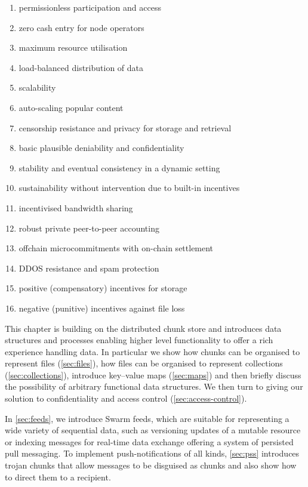 \begin{enumerate}
    \item permissionless participation and access
    \item zero cash entry for node operators
    \item maximum resource utilisation 
    \item load-balanced distribution of data
    \item scalability 
    \item auto-scaling popular content
    \item censorship resistance and privacy for storage and retrieval
    \item basic plausible deniability and confidentiality 
    \item stability and eventual consistency in a dynamic setting
    \item sustainability without intervention due to built-in incentives
    \item incentivised bandwidth sharing
    \item robust private peer-to-peer accounting 
    \item offchain microcommitments with on-chain settlement
    \item DDOS resistance and spam protection
    \item positive (compensatory) incentives for storage
    \item negative (punitive) incentives against file loss
\end{enumerate}

This chapter is building on the distributed chunk store and introduces data structures and processes enabling higher level functionality  to offer a rich experience handling data. In particular we show how chunks can be organised to represent files (\ref{sec:files}), how files can be organised to represent collections (\ref{sec:collections}), introduce key--value maps (\ref{sec:maps}) and then briefly discuss the possibility of arbitrary functional data structures. We then turn to giving our solution to confidentiality and access control (\ref{sec:access-control}). 

In \ref{sec:feeds}, we introduce Swarm feeds, which are suitable for representing a wide variety of sequential data, such as versioning updates of a mutable resource or indexing messages for real-time data exchange offering a system of persisted pull messaging. To implement push-notifications of all kinds, \ref{sec:pss} introduces trojan chunks that allow messages to be disguised as chunks and also show how to direct them to a recipient. 

